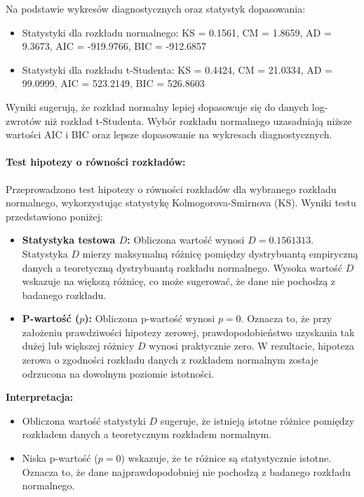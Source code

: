 \documentclass[a4paper,11pt]{article}
\begin{document}
Na podstawie wykresów diagnostycznych oraz statystyk dopasowania:
\begin{itemize}
    \item Statystyki dla rozkładu normalnego: KS = 0.1561, CM = 1.8659, AD = 9.3673, AIC = -919.9766, BIC = -912.6857
    \item Statystyki dla rozkładu t-Studenta: KS = 0.4424, CM = 21.0334, AD = 99.0999, AIC = 523.2149, BIC = 526.8603
\end{itemize}

Wyniki sugerują, że rozkład normalny lepiej dopasowuje się do danych log-zwrotów niż rozkład t-Studenta. Wybór rozkładu normalnego uzasadniają niższe wartości AIC i BIC oraz lepsze dopasowanie na wykresach diagnostycznych.

\paragraph{Test hipotezy o równości rozkładów:}

Przeprowadzono test hipotezy o równości rozkładów dla wybranego rozkładu normalnego, wykorzystując statystykę Kolmogorova-Smirnova (KS). Wyniki testu przedstawiono poniżej:

\begin{itemize}
    \item \textbf{Statystyka testowa \( D \):} Obliczona wartość wynosi \( D = 0.1561313 \). Statystyka \( D \) mierzy maksymalną różnicę pomiędzy dystrybuantą empiryczną danych a teoretyczną dystrybuantą rozkładu normalnego. Wysoka wartość \( D \) wskazuje na większą różnicę, co może sugerować, że dane nie pochodzą z badanego rozkładu.
    \item \textbf{P-wartość (\( p \)):} Obliczona p-wartość wynosi \( p = 0 \). Oznacza to, że przy założeniu prawdziwości hipotezy zerowej, prawdopodobieństwo uzyskania tak dużej lub większej różnicy \( D \) wynosi praktycznie zero. W rezultacie, hipoteza zerowa o zgodności rozkładu danych z rozkładem normalnym zostaje odrzucona na dowolnym poziomie istotności.
\end{itemize}

\textbf{Interpretacja:}
\begin{itemize}
    \item Obliczona wartość statystyki \( D \) sugeruje, że istnieją istotne różnice pomiędzy rozkładem danych a teoretycznym rozkładem normalnym. 
    \item Niska p-wartość (\( p = 0 \)) wskazuje, że te różnice są statystycznie istotne. Oznacza to, że dane najprawdopodobniej nie pochodzą z badanego rozkładu normalnego.
\end{itemize}
\end{document}
